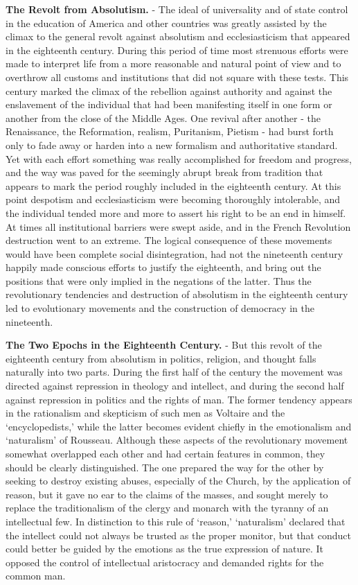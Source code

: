 \documentclass[
]{book}
\begin{document}
\textbf{The Revolt from Absolutism.} - The ideal of universality and of state control in the education of America and other countries was greatly assisted by the climax to the general revolt against absolutism and ecclesiasticism that appeared in the eighteenth century. During this period of time most strenuous efforts were made to interpret life from a more reasonable and natural point of view and to overthrow all customs and institutions that did not square with these tests. This century marked the climax of the rebellion against authority and against the enslavement of the individual that had been manifesting itself in one form or another from the close of the Middle Ages. One revival after another - the Renaissance, the Reformation, realism, Puritanism, Pietism - had burst forth only to fade away or harden into a new formalism and authoritative standard. Yet with each effort something was really accomplished for freedom and progress, and the way was paved for the seemingly abrupt break from tradition that appears to mark the period roughly included in the eighteenth century. At this point despotism and ecclesiasticism were becoming thoroughly intolerable, and the individual tended more and more to assert his right to be an end in himself. At times all institutional barriers were swept aside, and in the French Revolution destruction went to an extreme. The logical consequence of these movements would have been complete social disintegration, had not the nineteenth century happily made conscious efforts to justify the eighteenth, and bring out the positions that were only implied in the negations of the latter. Thus the revolutionary tendencies and destruction of absolutism in the eighteenth century led to evolutionary movements and the construction of democracy in the nineteenth.

\textbf{The Two Epochs in the Eighteenth Century.} - But this revolt of the eighteenth century from absolutism in politics, religion, and thought falls naturally into two parts. During the first half of the century the movement was directed against repression in theology and intellect, and during the second half against repression in politics and the rights of man. The former tendency appears in the rationalism and skepticism of such men as Voltaire and the `encyclopedists,' while the latter becomes evident chiefly in the emotionalism and `naturalism' of Rousseau. Although these aspects of the revolutionary movement somewhat overlapped each other and had certain features in common, they should be clearly distinguished. The one prepared the way for the other by seeking to destroy existing abuses, especially of the Church, by the application of reason, but it gave no ear to the claims of the masses, and sought merely to replace the traditionalism of the clergy and monarch with the tyranny of an intellectual few. In distinction to this rule of `reason,' `naturalism' declared that the intellect could not always be trusted as the proper monitor, but that conduct could better be guided by the emotions as the true expression of nature. It opposed the control of intellectual aristocracy and demanded rights for the common man.
\end{document}

